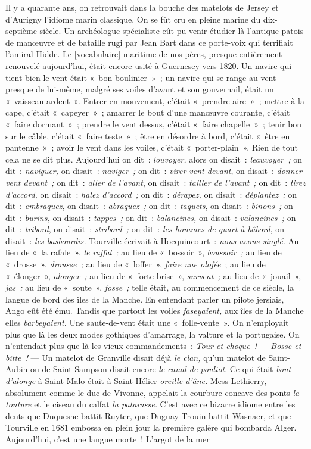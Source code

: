 \documentclass[french,twoside]{book} %
\newcommand\corr[1]{#1}
\begin{document}
Il y a quarante ans, on retrouvait dans la bouche des matelots de Jersey et d’Aurigny l’idiome marin classique. On se fût cru en pleine marine du dix-septième siècle. Un archéologue spécialiste eût pu venir étudier là l’antique patois de manœuvre et de bataille rugi par Jean Bart dans ce porte-voix qui terrifiait l’amiral Hidde. Le [{\corr vocabulaire}] maritime de nos pères, presque entièrement renouvelé aujourd’hui, était encore usité à Guernesey vers 1820. Un navire qui tient bien le vent était « bon boulinier » ; un navire qui se range au vent presque de lui-même, malgré ses voiles d’avant et son gouvernail, était un « vaisseau ardent ». Entrer en mouvement, c’était « prendre aire » ; mettre à la cape, c’était « capeyer » ; amarrer  le bout d’une manœuvre courante, c’était « faire dormant » ; prendre le vent dessus, c’était « faire chapelle » ; tenir bon sur le câble, c’était « faire teste » ; être en désordre à bord, c’était « être en pantenne » ; avoir le vent dans les voiles, c’était « porter-plain ». Rien de tout cela ne se dit plus. Aujourd’hui on dit : \emph{louvoyer,} alors on disait : \emph{leauvoyer ;} on dit : \emph{naviguer, }on disait : \emph{naviger ;} on dit : \emph{virer vent devant}, on disait : \emph{donner vent devant ;} on dit : \emph{aller de l’avant}, on disait : \emph{tailler de l’avant ;} on dit : \emph{tirez d’accord, }on disait : \emph{halez d’accord ;} on dit : \emph{dérapez,} on disait : \emph{déplantez ;} on dit : \emph{embraquez}, on disait : \emph{abraquez ; }on dit : \emph{taquets}, on disait : \emph{binons ;} on dit : \emph{burins,} on disait : \emph{tappes ;} on dit : \emph{balancines,} on disait : \emph{valancines ;} on dit : \emph{tribord}, on disait : \emph{stribord ;} on dit : \emph{les hommes de quart à bâbord}, on disait : \emph{les basbourdis. }Tourville écrivait à Hocquincourt : \emph{nous avons singlé}. Au lieu de « la rafale », \emph{le raffal ;} au lieu de « bossoir », \emph{boussoir ;} au lieu de « drosse », \emph{drousse ;} au lieu de « loffer », \emph{faire une olofée} ; au lieu de « élonger », \emph{alonger ;} au lieu de « forte brise », \emph{survent ;} au lieu de « jouail », \emph{jas ;} au lieu de « soute », \emph{fosse ;} telle était, au commencement de ce siècle, la langue de bord des îles de la Manche. En entendant parler un pilote jersiais, Ango eût été ému. Tandis que partout les voiles \emph{faseyaient,} aux îles de la Manche elles \emph{barbeyaient.} Une saute-de-vent était une « folle-vente ». On n’employait plus que là les deux modes gothiques d’amarrage, la valture et la portugaise. On n’entendait plus que là les vieux commandements : \emph{Tour-et-choque !}   — \emph{Bosse et bitte !} — Un matelot de Granville disait déjà \emph{le clan,} qu’un matelot de Saint-Aubin ou de Saint-Sampson disait encore \emph{le canal de pouliot}. Ce qui était \emph{bout d’alonge} à Saint-Malo était à Saint-Hélier \emph{oreille d’âne.} Mess Lethierry, absolument comme le duc de Vivonne, appelait la courbure concave des ponts \emph{la tonture} et le ciseau du calfat \emph{la patarasse.} C’est avec ce bizarre idiome entre les dents que Duquesne battit Ruyter, que Duguay-Trouin battit Wasnaer, et que Tourville en 1681 embossa en plein jour la première galère qui bombarda Alger. Aujourd’hui, c’est une langue morte ! L’argot de la mer 
\end{document}
